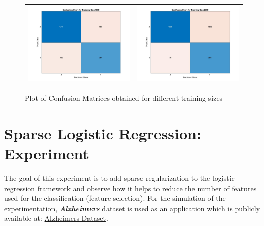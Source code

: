 \documentclass[11pt]{article}
\begin{document}
\begin{figure}[H]
\begin{adjustbox}{width=0.9\paperwidth}
\begin{tabular}{c c}
			\includegraphics{Codes/Results/Logistic Train/Conf_Chart_Train_Size_1500} & \includegraphics{Codes/Results/Logistic Train/Conf_Chart_Train_Size_2000}\\
		\end{tabular}
	\end{adjustbox}
	\caption{Plot of Confusion Matrices obtained for different training sizes}
	\label{fig:log_reg_Confusion_Mat}
\end{figure}

\section{\textbf{Sparse Logistic Regression: Experiment}}
The goal of this experiment is to add sparse regularization to the logistic regression framework and observe how it helps to reduce the number of features used for the classification (feature selection). For the simulation of the experimentation, \textit{\textbf{Alzheimers}} dataset is used as an application which is publicly available at: \href{https://github.com/jiayuzhou/CSE847/tree/master/data/alzheimers}{Alzheimers Dataset}.\\
\end{document}
